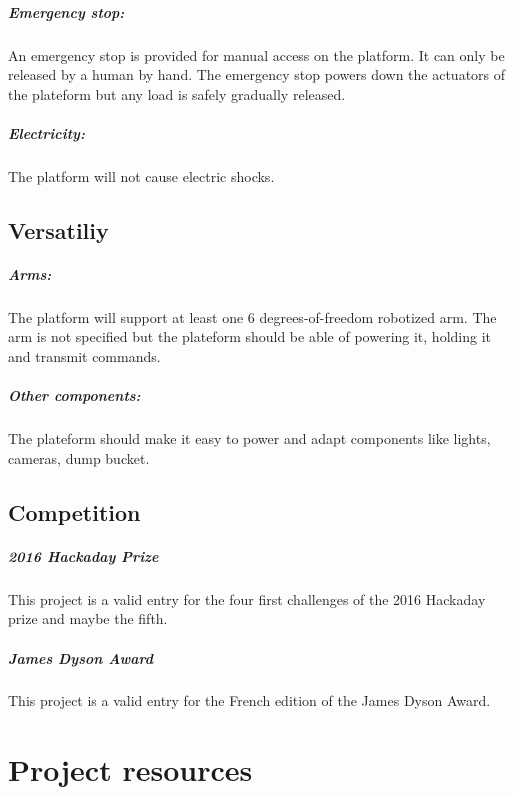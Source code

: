 \documentclass[oneside, DIV=11]{scrreprt}
\begin{document}
    \paragraph{Emergency stop: } An emergency stop is provided for manual access on the platform. It can only be released by a human by hand. The emergency stop powers down the actuators of the plateform but any load is safely gradually released.
    
    \paragraph{Electricity: } The platform will not cause electric shocks.
    
\section{Versatiliy}

    \paragraph{Arms: } The platform will support at least one 6 degrees-of-freedom robotized arm. The arm is not specified but the plateform should be able of powering it, holding it and transmit commands.
    
    \paragraph{Other components: } The plateform should make it easy to power and adapt components like lights, cameras, dump bucket.
    
    
\section{Competition}

    \paragraph{2016 Hackaday Prize} This project is a valid entry for the four first challenges of the 2016 Hackaday prize and maybe the fifth.
    
    \paragraph{James Dyson Award} This project is a valid entry for the French edition of the James Dyson Award.


\chapter{Project resources}
\end{document}

